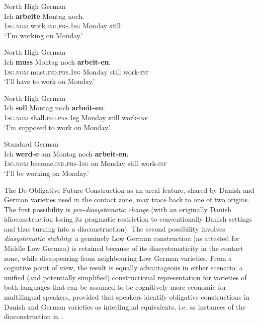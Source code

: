 \documentclass[output=paper]{langsci/langscibook}
\begin{document}
 
 \ea\label{ex:hoeder:5}
 	\ea\label{ex:hoeder:5a}
	North High German\\
	\gll Ich \textbf{arbeite} Montag noch.\\
     \textsc{1sg.nom} work.\textsc{ind.prs}.\textsc{1sg} Monday still\\
	\glt “I’m working on Monday.'

 	\ex\label{ex:hoeder:5b}
	North High German\\
	\gll Ich \textbf{muss} Montag noch \textbf{arbeit-en}.\\
     \textsc{1sg.nom} must.\textsc{ind.prs.1sg} Monday still work-\textsc{inf}\\
	\glt `I’ll have to work on Monday.'

 	\ex\label{ex:hoeder:5c}
	North High German\\
	\gll Ich \textbf{soll} Montag noch \textbf{arbeit-en}.\\
     1\textsc{sg.nom} shall.\textsc{ind.prs}.1sg Monday still work-\textsc{inf}\\
	\glt `I’m supposed to work on Monday.'

	\ex\label{ex:hoeder:5d}
	 Standard German\\
	\gll Ich \textbf{werd-e} am{} Montag noch \textbf{arbeit-en.}\\
     1\textsc{sg.nom} become.\textsc{ind.prs}{}-1\textsc{sg} on Monday still work-\textsc{inf}\\
	\glt `I’ll be working on Monday.'
	\z
\z

The De-Obligative Future Construction as an areal feature, shared by Danish and German varieties used in the contact zone, may trace back to one of two origins. The first possibility is \textit{pro-diasystematic} \textit{change} (with an originally Danish idioconstruction losing its pragmatic restriction to conventionally Danish settings and thus turning into a diaconstruction). The second possibility involves \textit{diasystematic} \textit{stability}: a genuinely Low German construction (as attested for Middle Low German) is retained because of its diasystematicity in the contact zone, while disappearing from neighbouring Low German varieties. From a cognitive point of view, the result is equally advantageous in either scenario: a unified (and potentially simplified) constructional representation for varieties of both languages that can be assumed to be cognitively more economic for multilingual speakers, provided that speakers identify obligative constructions in Danish and German varieties as interlingual equivalents, i.e. as instances of the diaconstruction in .
\end{document}
